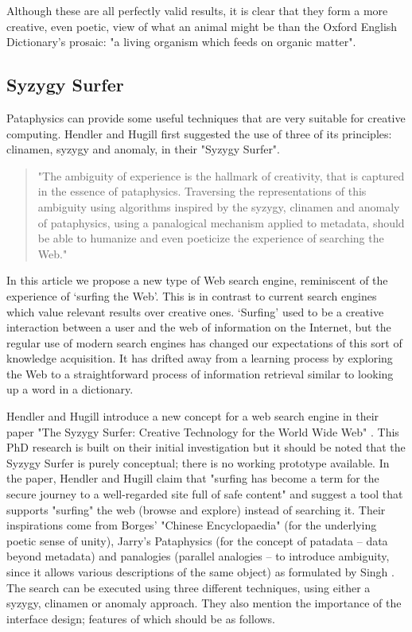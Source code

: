 Although these are all perfectly valid results, it is clear that they form a more creative, even poetic, view of what an animal might be than the Oxford English Dictionary's prosaic: "a living organism which feeds on organic matter".

\subsection{Syzygy Surfer}

Pataphysics can provide some useful techniques that are very suitable for creative computing. Hendler and Hugill first suggested the use of three of its principles: clinamen, syzygy and anomaly, in their "Syzygy Surfer".

\begin{quote}
  "The ambiguity of experience is the hallmark of creativity, that is captured in the essence of pataphysics. Traversing the representations of this ambiguity using algorithms inspired by the syzygy, clinamen and anomaly of pataphysics, using a panalogical mechanism applied to metadata, should be able to humanize and even poeticize the experience of searching the Web." \citep{Hendler2013}
\end{quote}

In this article we propose a new type of Web search engine, reminiscent of the experience of ‘surfing the Web'. This is in contrast to current search engines which value relevant results over creative ones. ‘Surfing' used to be a creative interaction between a user and the web of information on the Internet, but the regular use of modern search engines has changed our expectations of this sort of knowledge acquisition. It has drifted away from a learning process by exploring the Web to a straightforward process of information retrieval similar to looking up a word in a dictionary.

Hendler and Hugill introduce a new concept for a web search engine in their paper "The Syzygy Surfer: Creative Technology for the World Wide Web" \citep{Hendler2011}. This PhD research is built on their initial investigation but it should be noted that the Syzygy Surfer is purely conceptual; there is no working prototype available. In the paper, Hendler and Hugill claim that "surfing has become a term for the secure journey to a well-regarded site full of safe content" and suggest a tool that supports "surfing" the web (browse and explore) instead of searching it. Their inspirations come from Borges' "Chinese Encyclopaedia" \citep{Borges2000} (for the underlying poetic sense of unity), Jarry's Pataphysics (for the concept of patadata – data beyond metadata) and  panalogies (parallel analogies – to introduce ambiguity, since it allows various descriptions of the same object) as formulated by Singh \citep{Singh2005}. The search can be executed using three different techniques, using either a syzygy, clinamen or anomaly approach. They also mention the importance of the interface design; features of which should be as follows.

